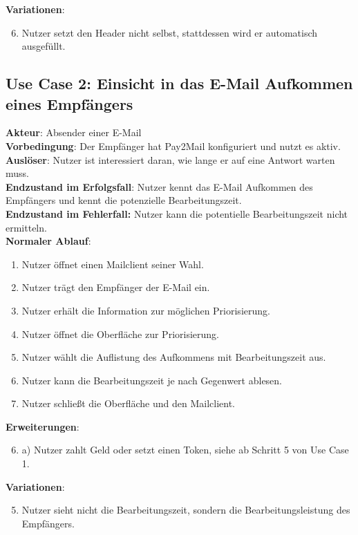 \noindent \textbf{Variationen}:
\begin{enumerate}
\setcounter{enumi}{5}
    \item \textquotesingle{} Nutzer setzt den Header nicht selbst, stattdessen wird er automatisch ausgefüllt.
\end{enumerate}


\subsection*{Use Case 2: Einsicht in das E-Mail Aufkommen eines Empfängers}
\textbf{Akteur}: Absender einer E-Mail \\
\textbf{Vorbedingung}: Der Empfänger hat Pay2Mail konfiguriert und nutzt es aktiv. \\
\textbf{Auslöser}: Nutzer ist interessiert daran, wie lange er auf eine Antwort warten muss. \\
\textbf{Endzustand im Erfolgsfall}: Nutzer kennt das E-Mail Aufkommen des Empfängers und kennt die potenzielle Bearbeitungszeit. \\
\textbf{Endzustand im Fehlerfall:} Nutzer kann die potentielle Bearbeitungszeit nicht ermitteln. \\

\noindent \textbf{Normaler Ablauf}:
\begin{enumerate}
    \item Nutzer öffnet einen Mailclient seiner Wahl.
    \item Nutzer trägt den Empfänger der E-Mail ein.
    \item Nutzer erhält die Information zur möglichen Priorisierung.
    \item Nutzer öffnet die Oberfläche zur Priorisierung.
    \item Nutzer wählt die Auflistung des Aufkommens mit Bearbeitungszeit aus.
    \item Nutzer kann die Bearbeitungszeit je nach Gegenwert ablesen.
    \item Nutzer schließt die Oberfläche und den Mailclient.
\end{enumerate}

\noindent \textbf{Erweiterungen}:
\begin{enumerate}
\setcounter{enumi}{5}
    \item a) Nutzer zahlt Geld oder setzt einen Token, siehe ab Schritt 5 von Use Case 1.
\end{enumerate}

\noindent \textbf{Variationen}:
\begin{enumerate}
\setcounter{enumi}{4}
    \item \textquotesingle{} Nutzer sieht nicht die Bearbeitungszeit, sondern die Bearbeitungsleistung des Empfängers.
\end{enumerate}


